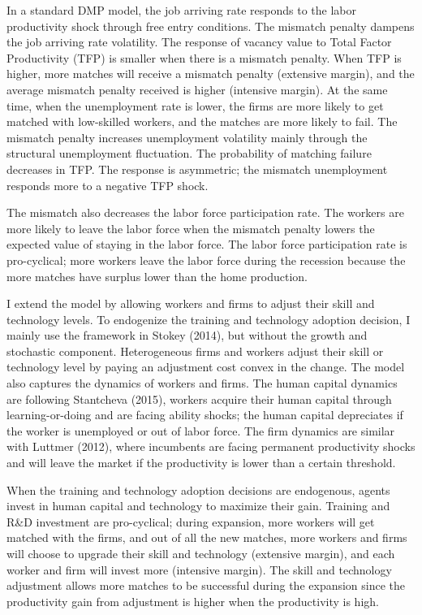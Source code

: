 \documentclass[12pt]{article}
\newcommand{\1}{\mathbb{1}}
\begin{document}
In a standard DMP model, the job arriving rate responds to the labor productivity shock through free entry conditions. The mismatch penalty dampens the job arriving rate volatility. The response of vacancy value to Total Factor Productivity (TFP) is smaller when there is a mismatch penalty. When TFP is higher, more matches will receive a mismatch penalty (extensive margin), and the average mismatch penalty received is higher (intensive margin). At the same time, when the unemployment rate is lower, the firms are more likely to get matched with low-skilled workers, and the matches are more likely to fail. The mismatch penalty increases unemployment volatility mainly through the structural unemployment fluctuation. The probability of matching failure decreases in TFP. The response is asymmetric; the mismatch unemployment responds more to a negative TFP shock. 

The mismatch also decreases the labor force participation rate. The workers are more likely to leave the labor force when the mismatch penalty lowers the expected value of staying in the labor force. The labor force participation rate is pro-cyclical; more workers leave the labor force during the recession because the more matches have surplus lower than the home production. 

I extend the model by allowing workers and firms to adjust their skill and technology levels. To endogenize the training and technology adoption decision, I mainly use the framework in Stokey (2014)\nocite{Stokey2014}, but without the growth and stochastic component. Heterogeneous firms and workers adjust their skill or technology level by paying an adjustment cost convex in the change. The model also captures the dynamics of workers and firms. 
The human capital dynamics are following Stantcheva (2015)\nocite{Stantcheva2015}, workers acquire their human capital through learning-or-doing and are facing ability shocks; the human capital depreciates if the worker is unemployed or out of labor force. 
The firm dynamics are similar with Luttmer (2012)\nocite{Luttmer2012}, where incumbents are facing permanent productivity shocks and will leave the market if the productivity is lower than a certain threshold.  

When the training and technology adoption decisions are endogenous, agents invest in human capital and technology to maximize their gain. Training and R\&D investment are pro-cyclical; during expansion, more workers will get matched with the firms, and out of all the new matches, more workers and firms will choose to upgrade their skill and technology (extensive margin), and each worker and firm will invest more (intensive margin). The skill and technology adjustment allows more matches to be successful during the expansion since the productivity gain from adjustment is higher when the productivity is high. 
\end{document}
